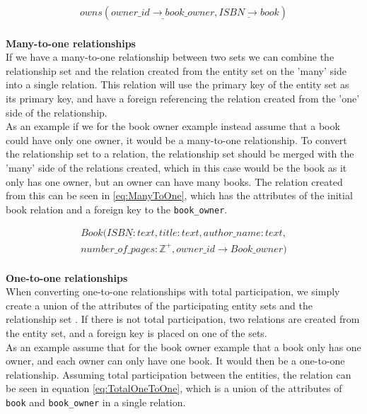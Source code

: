 \begin{equation}\label{eq:ManyToMany}
    \begin{split}
        owns(\underline{owner\_id \rightarrow book\_owner}, \underline{ISBN \rightarrow book})
    \end{split}
\end{equation}
\\
\textbf{Many-to-one relationships}\\
If we have a many-to-one relationship between two sets we can combine the relationship set and the relation created from the entity set on the 'many' side into a single relation. This relation will use the primary key of the entity set as its primary key, and have a foreign referencing the relation created from the 'one' side of the relationship.\\
As an example if we for the book owner example instead assume that a book could have only one owner, it would be a many-to-one relationship. To convert the relationship set to a relation, the relationship set should be merged with the 'many' side of the relations created, which in this case would be the book as it only has one owner, but an owner can have many books. The relation created from this can be seen in \ref*{eq:ManyToOne}, which has the attributes of the initial book relation and a foreign key to the \texttt{book\_owner}.

\begin{equation}\label{eq:ManyToOne}
    \begin{split}
        Book(\underline{ISBN : text} , title : text , author\_name : text , \\number\_of\_pages : \mathbb{Z}^+, owner\_id \rightarrow Book\_owner)
    \end{split}
\end{equation}
\\
\textbf{One-to-one relationships}\\
When converting one-to-one relationships with total participation, we simply create a union of the attributes of the participating entity sets and the relationship set \cite{DBSBook}. If there is not total participation, two relations are created from the entity set, and a foreign key is placed on one of the sets.\\
As an example assume that for the book owner example that a book only has one owner, and each owner can only have one book. It would then be a one-to-one relationship. Assuming total participation between the entities, the relation can be seen in equation \ref*{eq:TotalOneToOne}, which is a union of the attributes of \texttt{book} and \texttt{book\_owner} in a single relation.


